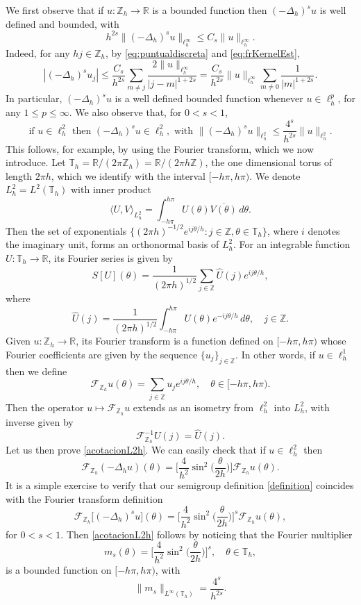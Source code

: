 \documentclass[a4paper,11pt,reqno]{amsart}
\newcommand{\R}{\mathbb{R}}
\newcommand{\Z}{\mathbb{Z}}
\newcommand{\T}{\mathbb{T}}
\theoremstyle{definition}
\numberwithin{equation}{section}
\begin{document}
We first observe that if $u:\Z_h\to\R$ is a bounded function then
$(-\Delta_h)^su$ is well defined and bounded, with
\begin{equation*}
h^{2s}\|(-\Delta_h)^su\|_{\ell^\infty_h}\leq C_s\|u\|_{\ell^\infty_h}.
\end{equation*}
Indeed, for any $hj\in\Z_h$, by \eqref{eq:puntualdiscreta} and \eqref{eq:frKernelEst},
$$
|(-\Delta_h)^su_j|\leq \frac{C_s}{h^{2s}}\sum_{m\neq j}\frac{2\|u\|_{\ell^\infty_h}}{|j-m|^{1+2s}}
=\frac{C_s}{h^{2s}}\|u\|_{\ell^\infty_h}\sum_{m\neq0}\frac{1}{|m|^{1+2s}}.
$$
In particular, $(-\Delta_h)^su$ is a well defined bounded function
whenever $u\in\ell^p_h$, for any $1\leq p\leq\infty$.
We also observe that, for $0<s<1$,
\begin{equation}
\label{acotacionL2h}
\text{if } u\in\ell^2_h \text{ then } (-\Delta_h)^su\in\ell^2_h,
\text{ with } \|(-\Delta_h)^su\|_{\ell^2_h}\leq
\frac{4^s}{h^{2s}}\|u\|_{\ell^2_h}.
\end{equation}
This follows, for example, by using the Fourier transform, which we now introduce.
Let $\T_h=\R/(2\pi\Z_h)=\R/(2\pi h\Z)$, the one dimensional torus of length $2\pi h$, which we identify
with the interval $[-h\pi,h\pi)$. We denote $L^2_h=L^2(\T_h)$ with inner product
$$
\langle U,V\rangle_{L^2_h} = \int_{-h\pi}^{h\pi}U(\theta)\overline{V(\theta)}\,d\theta.
$$
Then the set of exponentials
$\big\{(2\pi h)^{-1/2}e^{ij\theta/h}:j\in\Z,\theta\in\T_h\big\}$,
where $i$ denotes the imaginary unit,
forms an orthonormal basis of $L^2_h$.
For an integrable function $U:\T_h\to\R$, its Fourier series is given by
$$
S[U](\theta)=\frac{1}{(2\pi h)^{1/2}}\sum_{j\in\Z}\widehat{U}(j)e^{ij\theta/h},
$$
where
$$
\widehat{U}(j)=\frac{1}{(2\pi h)^{1/2}}\int_{-h\pi}^{h\pi}U(\theta)e^{-ij\theta/h}\,d\theta,\quad j\in\Z.
$$
Given $u:\Z_h\to\R$, its Fourier transform is a function defined on $[-h\pi,h\pi)$
whose Fourier coefficients are given by the sequence $\{u_j\}_{j\in\Z}$. In other words,
if $u\in\ell^1_h$ then we define
$$
\mathcal{F}_{\Z_h}u(\theta)=\sum_{j\in\Z}u_je^{ij\theta/h},\quad\theta\in[-h\pi,h\pi).
$$
Then the operator $u\mapsto\mathcal{F}_{\Z_h}u$ extends as an isometry from $\ell^2_h$
into $L^2_h$, with inverse given by
$$
\mathcal{F}^{-1}_{\Z_h}U(j)=\widehat{U}(j).
$$
Let us then prove \eqref{acotacionL2h}. We can easily check that
if $u\in\ell^2_h$ then
$$
\mathcal{F}_{\Z_h}(-\Delta_hu)(\theta) =
\bigg[\frac{4}{h^2}\sin^2\Big(\frac{\theta}{2h}\Big)\bigg]\mathcal{F}_{\Z_h}u(\theta).
$$
It is a simple exercise to verify that our semigroup definition \eqref{definition}
coincides with the Fourier transform definition
\begin{equation}
\label{Fouriertransformdefinition}
\mathcal{F}_{\Z_h}\big[(-\Delta_h)^su\big](\theta)
= \Big[\frac{4}{h^2}\sin^2\Big(\frac{\theta}{2h}\Big)\Big]^s
\mathcal{F}_{\Z_h}u(\theta),
\end{equation}
for $0<s<1$. Then \eqref{acotacionL2h} follows by noticing that the Fourier
multiplier
$$
m_s(\theta)=\bigg[\frac{4}{h^2}\sin^2\Big(\frac{\theta}{2h}\Big)\bigg]^s,\quad\theta\in\T_h,
$$
is a bounded function on $[-h\pi,h\pi)$, with
$$
\|m_s\|_{L^\infty(\T_h)}=\frac{4^s}{h^{2s}}.
$$
\end{document}
